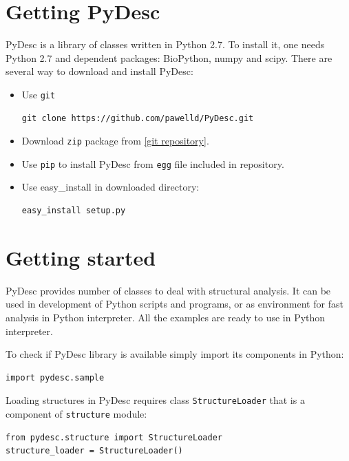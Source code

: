 \documentclass{article}
\begin{document}
\section{Getting PyDesc}

    PyDesc is a library of classes written in Python 2.7. To install it, one needs Python 2.7 and dependent packages: BioPython, numpy and scipy. There are several way to download and install PyDesc:

\begin{itemize}
\item Use \texttt{git}
\begin{lstlisting}
git clone https://github.com/pawelld/PyDesc.git
\end{lstlisting}

\item Download \texttt{zip} package from \href{https://github.com/pawelld/PyDesc}{[git repository]}.

\item Use \texttt{pip} to install PyDesc from \texttt{egg} file included in repository.

\item Use easy\_{}install in downloaded directory:
\begin{lstlisting}
easy_install setup.py
\end{lstlisting}

\end{itemize}



\section{Getting started}

    PyDesc provides number of classes to deal with structural analysis. It can be used in development of Python scripts and programs, or as environment for fast analysis in Python interpreter. All the examples are ready to use in Python interpreter.

    To check if PyDesc library is available simply import its components in Python:
\begin{lstlisting}
import pydesc.sample
\end{lstlisting}

    Loading structures in PyDesc requires class \texttt{StructureLoader} that is a component of \texttt{structure} module:

\begin{lstlisting}
from pydesc.structure import StructureLoader
structure_loader = StructureLoader()
\end{lstlisting}
\end{document}
